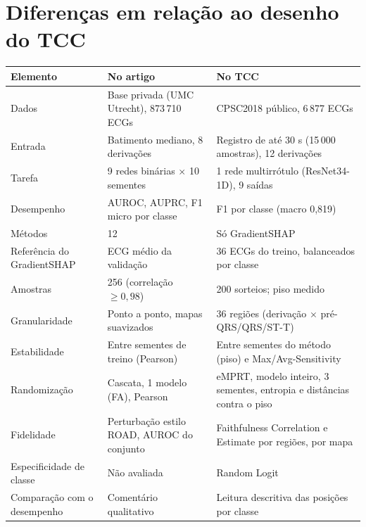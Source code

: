 \documentclass[11pt,a4paper]{article}
\begin{document}
\section{Diferenças em relação ao desenho do TCC}
\begin{center}\small
\begin{tabularx}{\linewidth}{p{3cm}XX}
\toprule
\textbf{Elemento} & \textbf{No artigo} & \textbf{No TCC} \\
\midrule
Dados & Base privada (UMC Utrecht), 873\,710 ECGs & CPSC2018 público, 6\,877 ECGs \\
Entrada & Batimento mediano, 8 derivações & Registro de até 30 s (15\,000 amostras), 12 derivações \\
Tarefa & 9 redes binárias $\times$ 10 sementes & 1 rede multirrótulo (ResNet34-1D), 9 saídas \\
Desempenho & AUROC, AUPRC, F1 micro por classe & F1 por classe (macro 0,819) \\
Métodos & 12 & Só GradientSHAP \\
Referência do GradientSHAP & ECG médio da validação & 36 ECGs do treino, balanceados por classe \\
Amostras & 256 (correlação $\geq 0{,}98$) & 200 sorteios; piso medido \\
Granularidade & Ponto a ponto, mapas suavizados & 36 regiões (derivação $\times$ pré-QRS/QRS/ST-T) \\
Estabilidade & Entre sementes de treino (Pearson) & Entre sementes do método (piso) e Max/Avg-Sensitivity \\
Randomização & Cascata, 1 modelo (FA), Pearson & eMPRT, modelo inteiro, 3 sementes, entropia e distâncias contra o piso \\
Fidelidade & Perturbação estilo ROAD, AUROC do conjunto & Faithfulness Correlation e Estimate por regiões, por mapa \\
Especificidade de classe & Não avaliada & Random Logit \\
Comparação com o desempenho & Comentário qualitativo & Leitura descritiva das posições por classe \\
\bottomrule
\end{tabularx}
\end{center}
\end{document}
